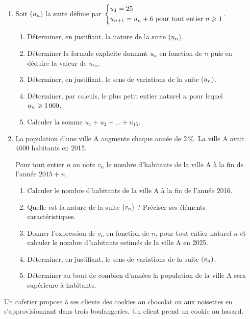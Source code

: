 \documentclass[a4paper,11pt]{article}
\begin{document}
\begin{enumerate}
	\item Soit $\suiten$ la suite définie par $\begin{dcases} u_1 = 25 \\ u_{n+1}=u_n+6 \text{ pour tout entier }n \pg 1 \end{dcases}$.
	\begin{enumerate}
		\item Déterminer, en justifiant, la nature de la suite $\suiten$.
		\item Déterminer la formule explicite donnant $u_n$ en fonction de $n$ puis en déduire la valeur de $u_{15}$.
		\item Déterminer, en justifiant, le sens de variations de la suite $\suiten$.
		\item Déterminer, par calculs, le plus petit entier naturel $n$ pour lequel $u_n \pg \num{1000}$.
		\item Calculer la somme $u_{1}+u_{2}+\ldots+u_{15}$.
	\end{enumerate}
	\item La population d’une ville A augmente chaque année de 2\,\%. La ville A avait \num{4600} habitants en 2015.
	
	Pour tout entier $n$ on note $v_n$ le nombre d’habitants de la ville A à la fin de l’année $2015+n$.
	\begin{enumerate}
		\item Calculer le nombre d’habitants de la ville A à la fin de l’année
		2016.
		\item Quelle est la nature de la suite $\suiten[v]$ ? Préciser ses éléments caractéristiques.
		\item Donner l’expression de $v_n$ en fonction de $n$, pour tout entier naturel $n$ et calculer le nombre d’habitants estimés de la ville A en 2025.
		\item Déterminer, en justifiant, le sens de variations de la suite $\suiten[v]$.
		\item Déterminer au bout de combien d’années la population de la ville A sera supérieure à  habitants.
	\end{enumerate} 
\end{enumerate}

\smallskip


\medskip

Un cafetier propose à ses clients des cookies au chocolat ou aux noisettes en s'approvisionnant dans trois boulangeries. Un client prend un cookie au hasard.
\end{document}
